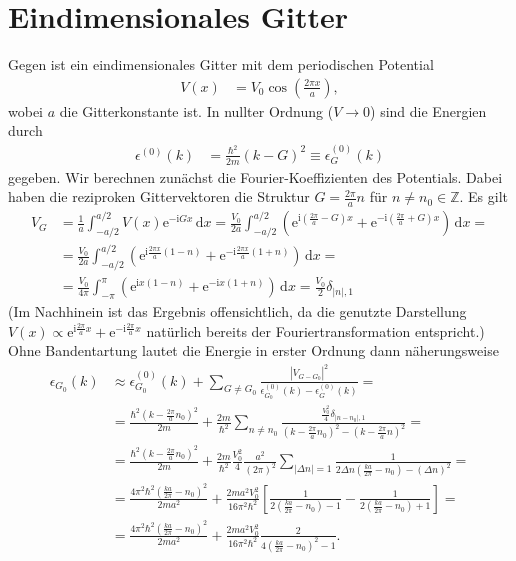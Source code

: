 \documentclass[english, parskip=full]{scrartcl}
\newcommand{\intx}{}
\newcommand{\kla}{}
\newcommand{\klam}{}
\renewcommand{\i}{\text{i}}
\newcommand{\e}{\text{e}}
\begin{document}
\section{Eindimensionales Gitter}
Gegen ist ein eindimensionales Gitter mit dem periodischen Potential
\begin{align}
V(x) &= V_0 \cos\kla\left( \frac{2\pi x}{a} \right),
\end{align}
wobei $a$ die Gitterkonstante ist.
In nullter Ordnung ($V\rightarrow 0$) sind die Energien durch
\begin{align}
\epsilon^{(0)} (k) &= \frac{\hbar^2}{2m} \kla\left( k - G \right)^2 \equiv \epsilon_G^{(0)}(k)
\end{align}
gegeben.
Wir berechnen zunächst die Fourier-Koeffizienten des Potentials.
Dabei haben die reziproken Gittervektoren die Struktur $G=\frac{2\pi}{a}n$ für $n\neq n_0\in\mathbb{Z}$.
Es gilt
\begin{align}
V_{G} &= \frac{1}{a}\intx\int_{-a/2}^{a/2} V(x) \e^{-\i Gx}  \, \mathrm{d}x = \frac{V_0}{2a} \intx\int_{-a/2}^{a/2} \kla\left( \e^{\i \kla\left( \frac{2\pi}{a} - G \right)x} + \e^{-\i \kla\left( \frac{2\pi}{a} + G \right)x} \right) \, \mathrm{d}x = \\
&= \frac{V_0}{2a} \intx\int_{-a/2}^{a/2} \kla\left( \e^{\i\frac{2\pi x}{a}(1-n)} + \e^{-\i\frac{2\pi x}{a}(1+n)} \right) \, \mathrm{d}x = \\
&= \frac{V_0}{4\pi} \intx\int_{-\pi}^{\pi} \kla\left( \e^{\i x(1-n)} + \e^{-\i x(1+n)} \right) \, \mathrm{d}x = \frac{V_0}{2} \delta_{|n|,1}
\end{align}
(Im Nachhinein ist das Ergebnis offensichtlich, da die genutzte Darstellung $V(x) \propto \e^{\i \frac{2\pi}{a} x} + \e^{-\i \frac{2\pi}{a} x}$ natürlich bereits der Fouriertransformation entspricht.)
\\
Ohne Bandentartung lautet die Energie in erster Ordnung dann näherungsweise
\begin{align}
\epsilon_{G_0}(k) &\approx \epsilon_{G_0}^{(0)}(k) + \sum_{G\neq G_0} \frac{|V_{G-G_0}|^2}{\epsilon_{G_0}^{(0)}(k) - \epsilon_{G}^{(0)}(k)} = \\
&= \frac{\hbar^2 \kla\left( k - \frac{2\pi}{a}n_0 \right)^2}{2m} + \frac{2m}{\hbar^2} \sum_{n\neq n_0} \frac{\frac{V_0^2}{4} \delta_{|n-n_0|,1}}{\left( k - \frac{2\pi}{a}n_0 \right)^2 - \left( k - \frac{2\pi}{a}n \right)^2} = \\
&= \frac{\hbar^2 \kla\left( k - \frac{2\pi}{a}n_0 \right)^2}{2m} + \frac{2m}{\hbar^2} \frac{V_0^2}{4} \frac{a^2}{(2\pi)^2} \sum_{|\Delta n| = 1} \frac{1}{2\Delta n\left( \frac{ka}{2\pi} - n_0 \right) - (\Delta n)^2} = \\
&= \frac{4\pi^2\hbar^2 \kla\left( \frac{ka}{2\pi} - n_0 \right)^2}{2ma^2} + \frac{2ma^2V_0^2}{16\pi^2\hbar^2} \klam\left[ \frac{1}{2\kla\left( \frac{ka}{2\pi} - n_0 \right) - 1} - \frac{1}{2\kla\left( \frac{ka}{2\pi} - n_0 \right) + 1} \right] = \\
&= \frac{4\pi^2\hbar^2 \kla\left( \frac{ka}{2\pi} - n_0 \right)^2}{2ma^2} + \frac{2ma^2V_0^2}{16\pi^2\hbar^2} \frac{2}{4\kla\left( \frac{ka}{2\pi} - n_0 \right)^2 - 1}.
\end{align}
\end{document}
